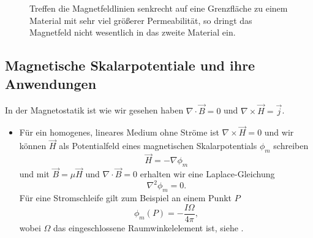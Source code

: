 \begin{figure}[ht]
	\centering
	\tfigMagneticRefraction
	\caption{Treffen die Magnetfeldlinien senkrecht auf eine Grenzfläche zu einem Material mit sehr viel größerer Permeabilität, so dringt das Magnetfeld nicht wesentlich in das zweite Material ein. }
	\label{fig:magnetic_refraction}
\end{figure}

\subsection{Magnetische Skalarpotentiale und ihre Anwendungen}



In der Magnetostatik ist wie wir gesehen haben $\nabla \cdot \vec {B}=0$ und $\nabla \times \vec {H}=\vec {j}$.
\begin{itemize}
	\item Für ein homogenes, lineares Medium ohne Ströme ist $\nabla \times \vec {H}=0$ und wir können $\vec {H}$ als Potentialfeld eines magnetischen Skalarpotentials $\phi _{m}$ schreiben
	      \begin{equation*}
		      \vec {H}=-\nabla \phi _{m}
	      \end{equation*}
	      und mit $\vec {B}=\mu \vec {H}$ und $\nabla \cdot \vec {B}=0$ erhalten wir eine Laplace-Gleichung
	      \begin{equation*}
		      \nabla ^{2}\phi _{m}=0.
	      \end{equation*}
	      Für eine Stromschleife gilt zum Beispiel an einem Punkt $P$
	      \begin{equation*}
		      \phi _{m}\left(P\right)=-\frac{I\Omega  }{4\pi },
	      \end{equation*}
	      wobei $\Omega$ das eingeschlossene Raumwinkelelement ist, siehe .


\end{itemize}
